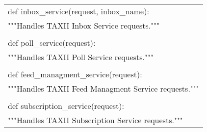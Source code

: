 \documentclass[11pt]{article}
\begin{document}
\begin{center}
	\begin{tabular}{|l|}
		\hline
		def inbox\_service(request, inbox\_name): \\
		"""Handles TAXII Inbox Service requests.""" \\ \\
		
		def poll\_service(request):\ \\
		"""Handles TAXII Poll Service requests.""" \\ \\
		
		def feed\_managment\_service(request): \\
		"""Handles TAXII Feed Managment Service requests.""" \\ \\
		
		def subscription\_service(request):\ \\
		"""Handles TAXII Subscription Service requests.""" \\
		\hline
	\end{tabular}
\end{center}
\end{document}
